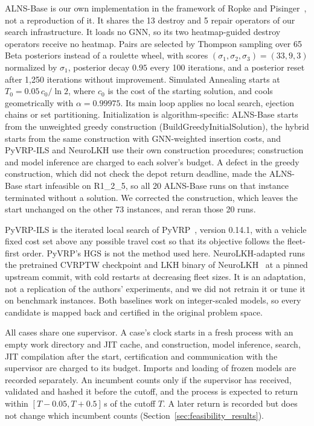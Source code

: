 \documentclass{ieeeaccess}
\begin{document}
ALNS-Base is our own implementation in the framework of Ropke and Pisinger~\cite{Ropke2006, pisinger2007general}, not a reproduction of it. It shares the 13 destroy and 5 repair operators of our search infrastructure. It loads no GNN, so its two heatmap-guided destroy operators receive no heatmap. Pairs are selected by Thompson sampling over 65 Beta posteriors instead of a roulette wheel, with scores $(\sigma_1, \sigma_2, \sigma_3) = (33, 9, 3)$ normalized by $\sigma_1$, posterior decay $0.95$ every 100 iterations, and a posterior reset after 1,250 iterations without improvement. Simulated Annealing starts at $T_0 = 0.05\,c_0 / \ln 2$, where $c_0$ is the cost of the starting solution, and cools geometrically with $\alpha = 0.99975$. Its main loop applies no local search, ejection chains or set partitioning. Initialization is algorithm-specific: ALNS-Base starts from the unweighted greedy construction (\textsf{\small BuildGreedyInitialSolution}), the hybrid starts from the same construction with GNN-weighted insertion costs, and PyVRP-ILS and NeuroLKH use their own construction procedures; construction and model inference are charged to each solver's budget. A defect in the greedy construction, which did not check the depot return deadline, made the ALNS-Base start infeasible on R1\_2\_5, so all 20 ALNS-Base runs on that instance terminated without a solution. We corrected the construction, which leaves the start unchanged on the other 73 instances, and reran those 20 runs.

PyVRP-ILS is the iterated local search of PyVRP~\cite{wouda2024pyvrp}, version 0.14.1, with a vehicle fixed cost set above any possible travel cost so that its objective follows the fleet-first order. PyVRP's HGS is not the method used here. NeuroLKH-adapted runs the pretrained CVRPTW checkpoint and LKH binary of NeuroLKH~\cite{xin2021neurolkh} at a pinned upstream commit, with cold restarts at decreasing fleet sizes. It is an adaptation, not a replication of the authors' experiments, and we did not retrain it or tune it on benchmark instances. Both baselines work on integer-scaled models, so every candidate is mapped back and certified in the original problem space.

All cases share one supervisor. A case's clock starts in a fresh process with an empty work directory and JIT cache, and construction, model inference, search, JIT compilation after the start, certification and communication with the supervisor are charged to its budget. Imports and loading of frozen models are recorded separately. An incumbent counts only if the supervisor has received, validated and hashed it before the cutoff, and the process is expected to return within $[T-0.05, T+0.5]$\,s of the cutoff $T$. A later return is recorded but does not change which incumbent counts (Section~\ref{sec:feasibility_results}).
\end{document}
